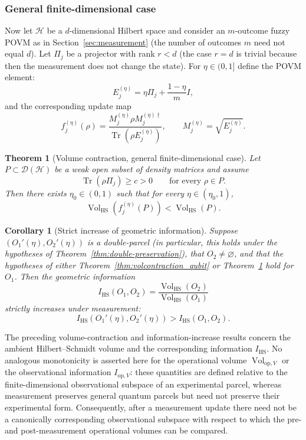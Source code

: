 \documentclass[11pt, onecolumn]{article}
\newtheorem{theorem}{Theorem}
\newtheorem{corollary}{Corollary}
\begin{document}
\subsubsection*{General finite-dimensional case}
Now let \(\mathcal{H}\) be a $d$-dimensional Hilbert space and consider an $m$-outcome fuzzy POVM as in Section~\ref{sec:measurement} (the number of outcomes $m$ need not equal $d$). Let \(\Pi_j\) be a projector with rank \(r<d\) (the case \(r=d\) is trivial because then the measurement does not change the state). For \(\eta\in(0,1]\) define the POVM element:
\[
E_j^{(\eta)} = \eta\Pi_j + \frac{1-\eta}{m}I,
\]
and the corresponding update map
\[
f_j^{(\eta)}(\rho) = \frac{M_j^{(\eta)}\rho M_j^{(\eta)\dagger}}{\operatorname{Tr}(\rho E_j^{(\eta)})},\qquad M_j^{(\eta)}=\sqrt{E_j^{(\eta)}}.
\]

\begin{theorem}[Volume contraction, general finite-dimensional case]
\label{thm:volcontraction_nqubits}
Let \(P\subset\mathcal{D}(\mathcal{H})\) be a weak open subset of density matrices and assume
\[
\operatorname{Tr}(\rho\Pi_j)\ge c>0 \qquad\text{for every }\rho\in P.
\]
Then there exists \(\eta_0\in(0,1)\) such that for every \(\eta\in(\eta_0,1)\),
\[
\operatorname{Vol}_{\mathrm{HS}}(f_j^{(\eta)}(P))<\operatorname{Vol}_{\mathrm{HS}}(P).
\]
\end{theorem}

\begin{corollary}[Strict increase of geometric information]\label{cor:strict-increase}
Suppose $(O_1'(\eta),O_2'(\eta))$ is a double-parcel (in particular, this holds under the hypotheses of Theorem~\ref{thm:double-preservation}), that $O_2\neq\varnothing$, and that the hypotheses of either Theorem~\ref{thm:volcontraction_qubit} or Theorem~\ref{thm:volcontraction_nqubits} hold for $O_1$. Then the geometric information
\[
I_{\mathrm{HS}}(O_1,O_2)=\frac{\operatorname{Vol}_{\mathrm{HS}}(O_2)}{\operatorname{Vol}_{\mathrm{HS}}(O_1)}
\]
strictly increases under measurement:
\[
I_{\mathrm{HS}}(O_1'(\eta),O_2'(\eta))>I_{\mathrm{HS}}(O_1,O_2).
\]
\end{corollary}

The preceding volume-contraction and information-increase results concern
the ambient Hilbert--Schmidt volume and the corresponding information
$I_{\mathrm{HS}}$. No analogous monotonicity is asserted here for the
operational volume $\operatorname{Vol}_{\mathrm{op},V}$ or the
observational information $I_{\mathrm{op},V}$: these quantities are
defined relative to the finite-dimensional observational subspace of an
experimental parcel, whereas measurement preserves general quantum parcels
but need not preserve their experimental form. Consequently, after a
measurement update there need not be a canonically corresponding
observational subspace with respect to which the pre- and post-measurement
operational volumes can be compared.
\end{document}
